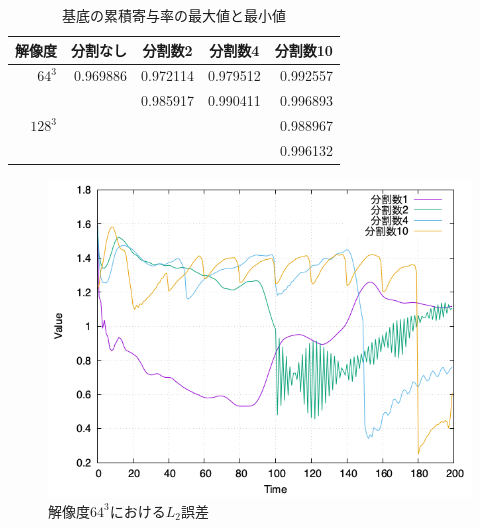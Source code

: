 \documentclass[a4j,12pt]{jreport}
\begin{document}



\begin {table}[htbp]
    \centering
  \caption{基底の累積寄与率の最大値と最小値}
  \label{tab:ruiseki}
  \begin {tabular}{rrrrr} \hline
    \multicolumn{1}{c}{解像度} 					&\multicolumn{1}{c}{分割なし} 		&\multicolumn{1}{c}{分割数2}			&\multicolumn{1}{c}{分割数4} 		&\multicolumn{1}{c}{分割数10}\\ \hline
    $64^3$ 									& 0.969886					& 0.972114						&0.979512	 				&0.992557				\\
    										&							&0.985917						&0.990411					&0.996893				\\ \hline
    $128^3$ 								&		 					&	 							&	 						&0.988967				\\ 
    										&							&								&							&0.996132				\\	\hline
  \end {tabular}
\end {table}

\begin{figure}[htbp]
\centering
\includegraphics[width=140mm]{images/64error.png}
\caption{$解像度64^3におけるL_2誤差$}
\label{fig:64error}
\end{figure}
\end{document}
